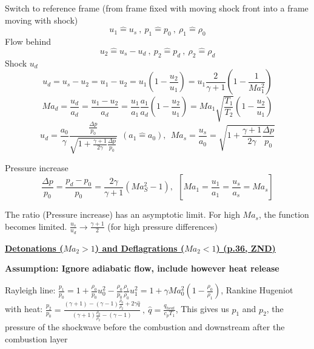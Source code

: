\documentclass[8pt, landscape, fleqn]{scrartcl}
\begin{document}
\begin{multicols*}{3}
Switch to reference frame (from frame fixed with moving shock front into a frame moving with shock)
\begin{equation*}
    u_1 \widehat{=} u_s~,~ p_1 \widehat{=} p_0~,~ \rho_1 \widehat{=} \rho_0
\end{equation*}
Flow behind
\begin{equation*}
    u_2 \widehat{=} u_s-u_d~,~ p_2 \widehat{=} p_d~,~ \rho_2 \widehat{=} \rho_d
\end{equation*}
Shock $u_d$
\begin{equation*}
    u_d = u_s - u_2 = u_1 - u_2 = u_1 \left( 1 - \frac{u_2}{u_1}\right) = u_1 \frac{2}{\gamma+1}\left(1- \frac{1}{Ma_1^2}\right)
\end{equation*}
\begin{equation*}
    Ma_d = \frac{u_d}{a_d} = \frac{u_1-u_2}{a_d} = \frac{u_1}{a_1}\frac{a_1}{a_d}\left( 1- \frac{u_2}{u_1}\right) = Ma_1 \sqrt{\frac{T_1}{T_2}}\left(1-\frac{u_2}{u_1}\right)
\end{equation*}
\begin{equation*}
    u_d = \frac{a_0}{\gamma} \frac{\frac{\Delta p}{p_0}}{\sqrt{1 + \frac{\gamma+1}{2\gamma} \frac{\Delta p}{p_0}}}~~(a_1 \hat{=} a_0), ~~ Ma_s = \frac{u_s}{a_0} = \sqrt{1 + \frac{\gamma+1}{2\gamma}\frac{\Delta p}{p_0}}
\end{equation*}

Pressure increase
\begin{equation*}
    \frac{\Delta p}{p_0} = \frac{p_d - p_0}{p_0} = \frac{2 \gamma}{\gamma + 1} \left( Ma_S^2 -1 \right),~~[Ma_1 = \frac{u_1}{a_1} = \frac{u_s}{a_s}=Ma_s]
\end{equation*}

The ratio (Pressure increase) has an asymptotic limit. For high $Ma_s$, the function becomes limited. $\frac{u_s}{u_d} \rightarrow \frac{\gamma+1}{2}$ (for high pressure differences) \newline

\underline{\textbf{Detonations ($Ma_2 >1$) and Deflagrations ($Ma_2 < 1$) (p.36, ZND)}}

\textbf{Assumption: Ignore adiabatic flow, include however heat release}

Rayleigh line: $\frac{p_1}{p_0} = 1 + \frac{\rho_0}{p_0} u_0^2 - \frac{\rho_0}{p_0}\frac{\rho_1}{\rho_0}u_1^2 = 1 + \gamma Ma_0^2 \left( 1 - \frac{\rho_0}{\rho_1}\right)$,
Rankine Hugeniot with heat: $\frac{p_2}{p_0} = \frac{(\gamma+1)-(\gamma-1)\frac{\rho_0}{\rho_2}+2\gamma \hat{q}}{(\gamma+1)\frac{\rho_0}{\rho_2}-(\gamma-1)}~,~ \hat{q} = \frac{q_{heat}}{c_p T_1}$, This gives us $p_1$ and $p_2$, the pressure of the shockwave before the combustion and downstream after the combustion layer \\


\end{multicols*}
\end{document}
